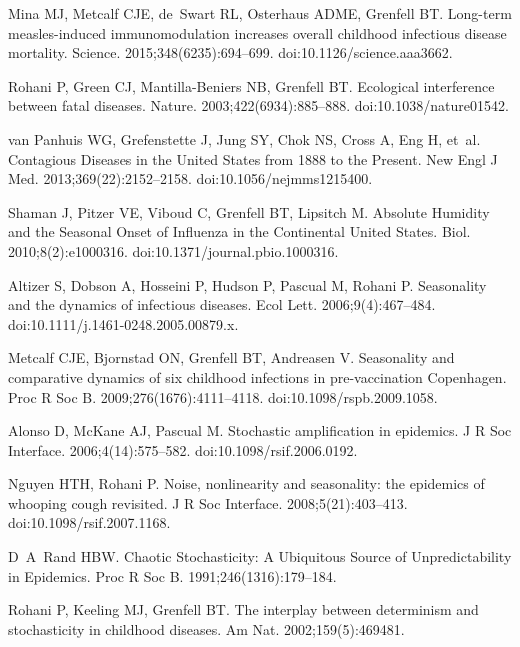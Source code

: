 \documentclass[10pt,letterpaper]{article}
\begin{document}
\begin{thebibliography}{10}
Mina MJ, Metcalf CJE, de~Swart RL, Osterhaus ADME, Grenfell BT.
\newblock Long-term measles-induced immunomodulation increases overall
  childhood infectious disease mortality.
\newblock Science. 2015;348(6235):694--699.
\newblock doi:{10.1126/science.aaa3662}.

Rohani P, Green CJ, Mantilla-Beniers NB, Grenfell BT.
\newblock Ecological interference between fatal diseases.
\newblock Nature. 2003;422(6934):885--888.
\newblock doi:{10.1038/nature01542}.

van Panhuis WG, Grefenstette J, Jung SY, Chok NS, Cross A, Eng H, et~al.
\newblock Contagious Diseases in the {United States} from 1888 to the Present.
\newblock New Engl J Med. 2013;369(22):2152--2158.
\newblock doi:{10.1056/nejmms1215400}.

Shaman J, Pitzer VE, Viboud C, Grenfell BT, Lipsitch M.
\newblock Absolute Humidity and the Seasonal Onset of Influenza in the
  Continental {United States}.
 Biol. 2010;8(2):e1000316.
\newblock doi:{10.1371/journal.pbio.1000316}.

Altizer S, Dobson A, Hosseini P, Hudson P, Pascual M, Rohani P.
\newblock Seasonality and the dynamics of infectious diseases.
\newblock Ecol Lett. 2006;9(4):467--484.
\newblock doi:{10.1111/j.1461-0248.2005.00879.x}.

Metcalf CJE, Bjornstad ON, Grenfell BT, Andreasen V.
\newblock Seasonality and comparative dynamics of six childhood infections in
  pre-vaccination {Copenhagen}.
\newblock Proc R Soc B. 2009;276(1676):4111--4118.
\newblock doi:{10.1098/rspb.2009.1058}.

Alonso D, McKane AJ, Pascual M.
\newblock Stochastic amplification in epidemics.
\newblock J R Soc Interface. 2006;4(14):575--582.
\newblock doi:{10.1098/rsif.2006.0192}.

Nguyen HTH, Rohani P.
\newblock Noise, nonlinearity and seasonality: the epidemics of whooping cough
  revisited.
\newblock J R Soc Interface. 2008;5(21):403--413.
\newblock doi:{10.1098/rsif.2007.1168}.

D~A~Rand HBW.
\newblock Chaotic Stochasticity: A Ubiquitous Source of Unpredictability in
  Epidemics.
\newblock Proc R Soc B. 1991;246(1316):179--184.

Rohani P, Keeling MJ, Grenfell BT.
\newblock The interplay between determinism and stochasticity in childhood
  diseases.
\newblock Am Nat. 2002;159(5):469{\textendash}481.


\end{thebibliography}
\end{document}
